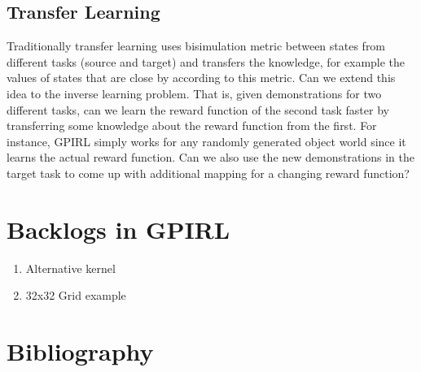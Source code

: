 \documentclass{article}[11pt]
\begin{document}
\subsection{Transfer Learning}
Traditionally transfer learning uses bisimulation metric between states from different tasks (source and target) and transfers the knowledge, for example the values of states that are close by according to this metric. Can we extend this idea to the inverse learning problem. That is, given demonstrations for two different tasks, can we learn the reward function of the second task faster by transferring some knowledge about the reward function from the first. For instance, GPIRL simply works for any randomly generated object world since it learns the actual reward function. Can we also use the new demonstrations in the target task to come up with additional mapping for a changing reward function? 




\section{Backlogs in GPIRL}
\begin{enumerate}
\item Alternative kernel
\item 32x32 Grid example
\end{enumerate}

\section{Bibliography}



\end{document}
